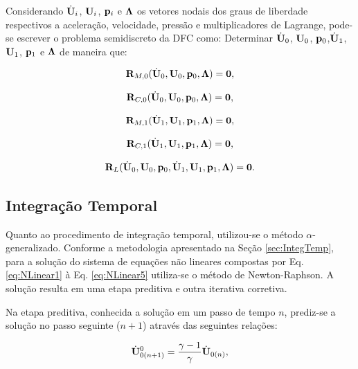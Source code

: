 \documentclass[tese_patricia]{subfiles}
\begin{document}
Considerando $\dot{\mathbf{U}}_{i}$, $\mathbf{U}_{i}$, $\mathbf{p}_i$ e $\boldsymbol{\Lambda}$ os vetores nodais dos graus de liberdade respectivos a aceleração, velocidade, pressão e multiplicadores de Lagrange, pode-se escrever o problema semidiscreto da DFC como: Determinar $\dot{\mathbf{U}}_0$, $\mathbf{U}_0$, $\mathbf{p}_0$,$\dot{\mathbf{U}}_1$, $\mathbf{U}_1$, $\mathbf{p}_1$ e $\boldsymbol{\Lambda}$ de maneira que:

\begin{align}
	\mathbf{R}_{M,0}(\dot{\mathbf{U}}_0,\mathbf{U}_0,\mathbf{p}_0,\boldsymbol{\Lambda}) = \mathbf{0}, \label{eq:NLinear1}
\end{align}

\begin{align}
	\mathbf{R}_{C,0}(\dot{\mathbf{U}}_0,\mathbf{U}_0,\mathbf{p}_0,\boldsymbol{\Lambda}) = \mathbf{0},
\end{align}

\begin{align}
	\mathbf{R}_{M,1}(\dot{\mathbf{U}}_1,\mathbf{U}_1,\mathbf{p}_1,\boldsymbol{\Lambda}) = \mathbf{0},
\end{align}

\begin{align}
	\mathbf{R}_{C,1}(\dot{\mathbf{U}}_1,\mathbf{U}_1,\mathbf{p}_1,\boldsymbol{\Lambda}) = \mathbf{0},
\end{align}

\begin{align}
	\mathbf{R}_{L}(\dot{\mathbf{U}}_0,\mathbf{U}_0,\mathbf{p}_0,\dot{\mathbf{U}}_1,\mathbf{U}_1,\mathbf{p}_1,\boldsymbol{\Lambda}) = \mathbf{0}. \label{eq:NLinear5}
\end{align}


\subsection{Integração Temporal}


Quanto ao procedimento de integração temporal, utilizou-se o método $\alpha$-generalizado. Conforme a metodologia apresentado na Seção \ref{sec:IntegTemp}, para a solução do sistema de equações não lineares compostas por Eq. \eqref{eq:NLinear1} à Eq. \eqref{eq:NLinear5} utiliza-se o método de Newton-Raphson. A solução resulta em uma etapa preditiva e outra iterativa corretiva.

Na etapa preditiva, conhecida a solução em um passo de tempo $n$, prediz-se a solução no passo seguinte ($n+1$) através das seguintes relações:

\begin{align}
	\dot{\mathbf{U}}_{0(n+1)}^{0} = \frac{\gamma-1}{\gamma}\dot{\mathbf{U}}_{0(n)} \label{eq:PredArlq1},
\end{align}
\end{document}
